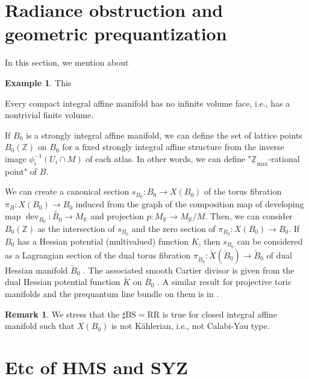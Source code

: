 \documentclass[a4paper,dvipdfmx,reqno,12pt]{amsart}
\theoremstyle{definition}
\newtheorem{Eg}[Thm]{Example}
\newtheorem{Rmk}[Thm]{Remark}
\newcommand{\R}{\mathbb{R}}%
\newcommand{\Z}{\mathbb{Z}}%
\newcommand{\opn}[1]{\operatorname{#1}}
\numberwithin{equation}{section}
\begin{document}
\section{Radiance obstruction and geometric prequantization}
\label{sec: BSRR}
In this section, we mention about 

\begin{Eg}
This 
\end{Eg}

Every compact integral affine manifold has no infinite volume face,
 i.e., has a nontrivial finite volume.

If $B_0$ is a strongly integral affine manifold,
we can define the set of lattice points $B_0(\Z)$ 
on $B_0$ for a fixed strongly integral affine structure from 
the inverse image $\phi^{-1}_i(U_i\cap M)$ of each atlas.
In other words, we can define 
"$\underline{\Z}_{\max}$-rational point" of $B$.


We can create a canonical section 
$s_{B_0}\colon B_0 \to X(B_0)$ of the torus fibration
 $\pi_B:X(B_0)\to B_0$
induced from the graph of the composition map of developing map
$\opn{dev}_{B_0}\colon \widetilde{B_0}\to M_{\R}$ 
\cite[p.641]{goldmanRadianceObstructionParallel1984a} and projection
$p:M_{\R}\to M_{\R}/M$. 
Then, we can consider $B_0(\Z)$ as the intersection of 
$s_{B_0}$ and the zero section of $\pi_{B_0}:X(B_0)\to B_0$.
If $B_0$ has a Hessian potential (multivalued) function $K$, then $s_{B_0}$ can be 
considered as a Lagrangian section of the dual torus 
fibration $\pi_{\check{B}_0}\colon \check{X}(\check{B}_0)\to \check{B}_0$ of dual Hessian
manifold $\check{B}_0$ \cite[Proposition 6.9]{aspinwallDirichletBranesMirror2009}.
The associated smooth Cartier divisor is 
given from the dual Hessian potential function
$\check{K}$ on $\check{B_0}$ 
\cite[p.429]{aspinwallDirichletBranesMirror2009}.
A similar result for projective toric manifolds and the prequantum line bundle on them
is in \cite[Theorem 3.20]{yamaguchimaster}.

\begin{Rmk}
  We stress that the $\sharp \mathrm{BS}=\mathrm{RR}$ is true for closed integral affine manifold such that $X(B_0)$ is not K\"ahlerian, i.e., not Calabi-Yau type.
\end{Rmk}



\section{Etc of HMS and SYZ}
\end{document}
